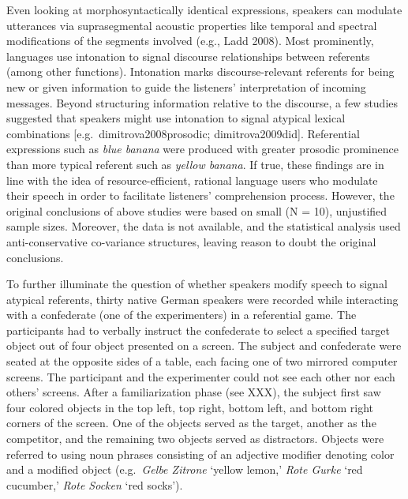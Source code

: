\documentclass[
  12pt,
]{article}
\begin{document}
Even looking at morphosyntactically identical expressions, speakers can modulate utterances via suprasegmental acoustic properties like temporal and spectral modifications of the segments involved (e.g., Ladd 2008).
Most prominently, languages use intonation to signal discourse relationships between referents (among other functions).
Intonation marks discourse-relevant referents for being new or given information to guide the listeners' interpretation of incoming messages.
Beyond structuring information relative to the discourse, a few studies suggested that speakers might use intonation to signal atypical lexical combinations {[}e.g.~dimitrova2008prosodic; dimitrova2009did{]}.
Referential expressions such as \emph{blue banana} were produced with greater prosodic prominence than more typical referent such as \emph{yellow banana}.
If true, these findings are in line with the idea of resource-efficient, rational language users who modulate their speech in order to facilitate listeners' comprehension process.
However, the original conclusions of above studies were based on small (N = 10), unjustified sample sizes.
Moreover, the data is not available, and the statistical analysis used anti-conservative co-variance structures, leaving reason to doubt the original conclusions.

To further illuminate the question of whether speakers modify speech to signal atypical referents, thirty native German speakers were recorded while interacting with a confederate (one of the experimenters) in a referential game.
The participants had to verbally instruct the confederate to select a specified target object out of four object presented on a screen.
The subject and confederate were seated at the opposite sides of a table, each facing one of two mirrored computer screens.
The participant and the experimenter could not see each other nor each others' screens.
After a familiarization phase (see XXX), the subject first saw four colored objects in the top left, top right, bottom left, and bottom right corners of the screen.
One of the objects served as the target, another as the competitor, and the remaining two objects served as distractors.
Objects were referred to using noun phrases consisting of an adjective modifier denoting color and a modified object (e.g.~\emph{Gelbe Zitrone} `yellow lemon,' \emph{Rote Gurke} `red cucumber,' \emph{Rote Socken} `red socks').
\end{document}
